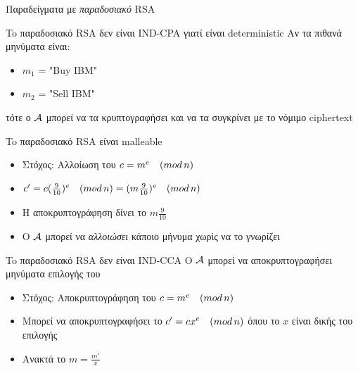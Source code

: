 \documentclass{beamer}
\begin{document}
\begin{frame}[allowframebreaks]{Παραδείγματα με \textit{παραδοσιακό} RSA}
\begin{block}{To παραδοσιακό RSA δεν είναι IND-CPA γιατί είναι deterministic}
Αν τα πιθανά μηνύματα είναι:
\begin{itemize}
\item $m_1$ = "Buy IBM"
\item $m_2$ = "Sell IBM"
\end{itemize}
τότε ο $\mathcal{A}$ μπορεί να τα κρυπτογραφήσει και να τα συγκρίνει με το νόμιμο ciphertext
\end{block}

\begin{block}{To παραδοσιακό RSA είναι malleable}
\begin{itemize}
\item Στόχος: Αλλοίωση του $c = m^e \quad (mod \, {n})$
\item $c' = c (\frac{9}{10})^e \quad (mod \, {n}) = (m \frac{9}{10})^e \quad (mod \, {n})$
\item H αποκρυπτογράφηση δίνει το $m \frac{9}{10}$
\item Ο $\mathcal{A}$ μπορεί να \textit{αλλοιώσει} κάποιο μήνυμα χωρίς να το γνωρίζει
\end{itemize}
\end{block}

\begin{block}{To παραδοσιακό RSA δεν είναι IND-CCA}
Ο $\mathcal{A}$ μπορεί να αποκρυπτογραφήσει μηνύματα επιλογής του
\begin{itemize}
\item Στόχος: Αποκρυπτογράφηση του $c = m^e \quad (mod \, {n})$
\item Μπορεί να αποκρυπτογραφήσει το $ c'= c x^e \quad (mod \, {n})$ όπου το $x$ είναι δικής του επιλογής
\item Ανακτά το $m = \frac{m'}{x}$ 
\end{itemize}
\end{block}

\end{frame}
\end{document}
